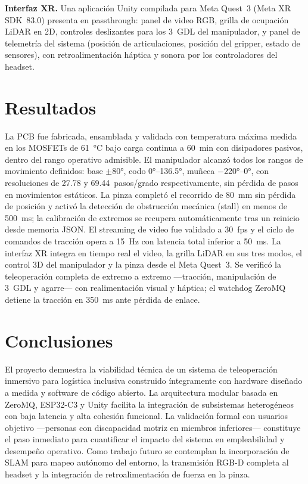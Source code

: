 \documentclass[12pt,letterpaper]{article}
\begin{document}
\textbf{Interfaz XR.}
Una aplicación Unity compilada para Meta Quest~3 (Meta XR SDK~83.0) presenta en
passthrough: panel de video RGB, grilla de ocupación LiDAR en 2D, controles
deslizantes para los 3~GDL del manipulador, y panel de telemetría del sistema
(posición de articulaciones, posición del gripper, estado de sensores), con
retroalimentación háptica y sonora por los controladores del headset.

\section{Resultados}

La PCB fue fabricada, ensamblada y validada con temperatura máxima medida en los
MOSFETs de \SI{61}{\degreeCelsius} bajo carga continua a \SI{60}{\minute} con
disipadores pasivos, dentro del rango operativo admisible. El manipulador alcanzó
todos los rangos de movimiento definidos: base $\pm$80°, codo 0°--136.5°, muñeca
$-$220°--0°, con resoluciones de 27.78 y 69.44~pasos/grado respectivamente, sin
pérdida de pasos en movimientos estáticos. La pinza completó el recorrido de
\SI{80}{mm} sin pérdida de posición y activó la detección de obstrucción mecánica
(stall) en menos de \SI{500}{\milli\second}; la calibración de extremos se recupera
automáticamente tras un reinicio desde memoria JSON. El streaming de video fue
validado a 30~fps y el ciclo de comandos de tracción opera a 15~Hz con latencia
total inferior a \SI{50}{\milli\second}. La interfaz XR integra en tiempo real el
video, la grilla LiDAR en sus tres modos, el control 3D del manipulador y la pinza
desde el Meta Quest~3. Se verificó la teleoperación completa de extremo a
extremo ---tracción, manipulación de 3~GDL y agarre--- con realimentación visual y
háptica; el watchdog ZeroMQ detiene la tracción en \SI{350}{\milli\second} ante
pérdida de enlace.

\section{Conclusiones}

El proyecto demuestra la viabilidad técnica de un sistema de teleoperación inmersivo
para logística inclusiva construido íntegramente con hardware diseñado a medida y
software de código abierto. La arquitectura modular basada en ZeroMQ, ESP32-C3 y
Unity facilita la integración de subsistemas heterogéneos con baja latencia y alta
cohesión funcional. La validación formal con usuarios objetivo ---personas con
discapacidad motriz en miembros inferiores--- constituye el paso inmediato para
cuantificar el impacto del sistema en empleabilidad y desempeño operativo. Como
trabajo futuro se contemplan la incorporación de SLAM para mapeo autónomo del entorno,
la transmisión RGB-D completa al headset y la integración de retroalimentación de
fuerza en la pinza.
\end{document}
